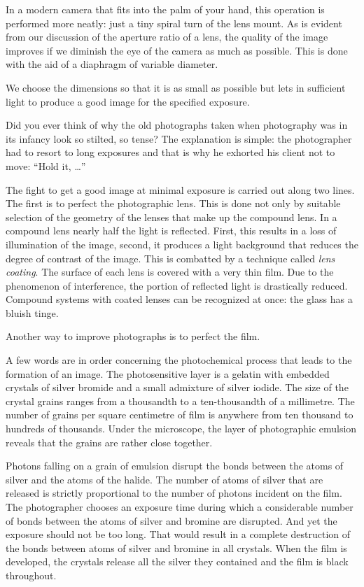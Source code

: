 In a modern camera that fits into the palm of your hand, this operation is performed more neatly: just a tiny spiral turn of the lens mount. As is evident from our discussion of the aperture ratio of a lens, the quality of the image improves if we diminish the eye of the camera as much as possible. This is done with the aid of a dia­phragm of variable diameter.

We choose the dimensions so that it is as small as possible but lets in sufficient light to produce a good im­age for the specified exposure.

Did you ever think of why the old photographs taken when photography was in its infancy look so stilted, so tense? The explanation is simple: the photographer had to resort to long exposures and that is why he ex­horted his client not to move: ``Hold it, \ldots{}''

The fight to get a good image at minimal exposure is carried out along two lines. The first is to perfect the pho­tographic lens. This is done not only by suitable selection of the geometry of the lenses that make up the compound lens. In a compound lens  nearly half the light is reflected. First, this results in a loss of illumination of the image, second, it produces a light background that reduces the degree of contrast of the image. This is combatted by a technique called \emph{lens coating}. The surface of each lens is covered with a very thin film. Due to the phenomenon of interference, the portion of reflected light is drastically reduced. Compound systems with coated lenses can be recognized at once: the glass has a bluish tinge.

Another way to improve photographs is to perfect the film.

A few words are in order concerning the photochemical process that leads to the formation of an image. The photosensitive layer is a gelatin with embedded crystals of silver bromide and a small admixture of silver iodide. The size of the crystal grains ranges from a thousandth to a ten-thousandth of a millimetre. The number of grains per square centimetre of film is anywhere from ten thou­sand to hundreds of thousands. Under the microscope, the layer of photographic emulsion reveals that the grains are rather close together.

Photons falling on a grain of emulsion disrupt the bonds between the atoms of silver and the atoms of the halide. The number of atoms of silver that are released is strictly proportional to the number of photons incident on the film. The photographer chooses an exposure time during which a considerable number of bonds between the atoms of silver and bromine are disrupted. And yet the exposure should not be too long. That would result in a complete destruction of the bonds between atoms of silver and bromine in all crystals. When the film is developed, the crystals release all the silver they contained and the film is black throughout.

